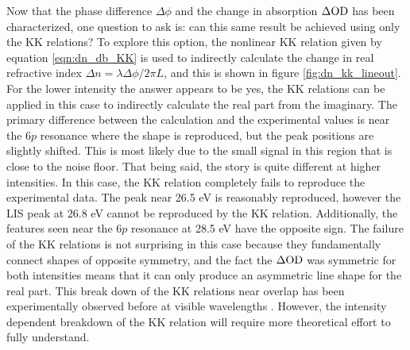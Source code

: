 Now that the phase difference $\Delta\phi$ and the change in absorption $\Delta\mathrm{OD}$ has been characterized, one question to ask is: can this same result be achieved using only the KK relations? To explore this option, the nonlinear KK relation given by equation \ref{eqn:dn_db_KK} is used to indirectly calculate the change in real refractive index $\Delta n = \lambda \Delta\phi/2\pi L$, and this is shown in figure \ref{fig:dn_kk_lineout}.  For the lower intensity the answer appears to be yes, the KK relations can be applied in this case to indirectly calculate the real part from the imaginary.  The primary difference between the calculation and the experimental values is near the $6p$ resonance where the shape is reproduced, but the peak positions are slightly shifted.  This is most likely due to the small signal in this region that is close to the noise floor.  That being said, the story is quite different at higher intensities.  In this case, the KK relation completely fails to reproduce the experimental data.  The peak near 26.5 eV is reasonably reproduced, however the LIS peak at 26.8 eV cannot be reproduced by the KK relation.  Additionally, the features seen near the $6p$ resonance at 28.5 eV have the opposite sign.  The failure of the KK relations is not surprising in this case because they fundamentally connect shapes of opposite symmetry, and the fact the $\Delta\mathrm{OD}$ was symmetric for both intensities means that it can only produce an asymmetric line shape for the real part.  This break down of the KK relations near overlap has been experimentally observed before at visible wavelengths \cite{tokunagaFemtosecondTimeresolvedDispersion1993}.  However, the intensity dependent breakdown of the KK relation will require more theoretical effort to fully understand.

